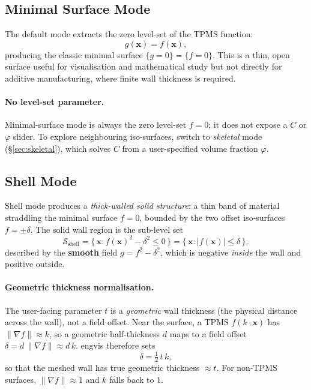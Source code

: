 \documentclass[11pt]{article}
\begin{document}
\subsection{Minimal Surface Mode}

The default mode extracts the zero level-set of the TPMS function:
\begin{equation}
  g(\mathbf{x}) = f(\mathbf{x}),
\end{equation}
producing the classic minimal surface $\{g = 0\} = \{f = 0\}$.
This is a thin, open surface useful for visualisation and mathematical
study but not directly for additive manufacturing, where finite wall
thickness is required.

\paragraph{No level-set parameter.}
Minimal-surface mode is always the zero level-set $f=0$; it does not
expose a $C$ or $\varphi$ slider.  To explore neighbouring iso-surfaces,
switch to \emph{skeletal} mode (\S\ref{sec:skeletal}), which solves
$C$ from a user-specified volume fraction $\varphi$.

\subsection{Shell Mode}\label{sec:shell}

Shell mode produces a \emph{thick-walled solid structure}: a thin
band of material straddling the minimal surface $f=0$, bounded by the
two offset iso-surfaces $f = \pm\delta$.  The solid wall region is the
sub-level set
\begin{equation}\label{eq:shell}
  \mathcal{S}_{\text{shell}}
    = \bigl\{\,\mathbf{x} : f(\mathbf{x})^2 - \delta^2 \le 0 \,\bigr\}
    = \bigl\{\,\mathbf{x} : |f(\mathbf{x})| \le \delta \,\bigr\},
\end{equation}
described by the \textbf{smooth} field $g = f^2 - \delta^2$, which is
negative \emph{inside} the wall and positive outside.

\paragraph{Geometric thickness normalisation.}\label{sec:thickness-norm}
The user-facing parameter $t$ is a \emph{geometric} wall thickness
(the physical distance across the wall), not a field offset.  Near the
surface, a TPMS $f(k\cdot\mathbf{x})$ has
$\|\nabla f\| \approx k$, so a geometric half-thickness $d$
maps to a field offset $\delta = d\,\|\nabla f\| \approx d\,k$.
engvis therefore sets
\begin{equation}\label{eq:thickness}
  \delta = \tfrac{1}{2}\, t \, k,
\end{equation}
so that the meshed wall has true geometric thickness $\approx t$.  For
non-TPMS surfaces, $\|\nabla f\| \approx 1$ and $k$ falls back to $1$.
\end{document}
